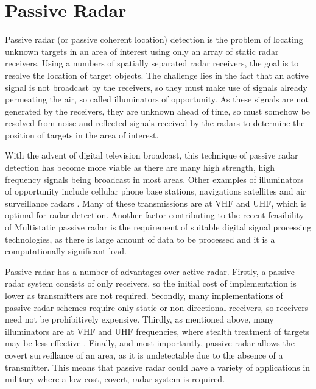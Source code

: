 \documentclass[12pt,openany,a4paper]{book}
\begin{document}
\section{Passive Radar}

Passive radar (or passive coherent location) detection is the problem of locating unknown targets in an area of interest using only an array of static radar receivers. Using a numbers of spatially separated radar receivers, the goal is to resolve the location of target objects. The challenge lies in the fact that an active signal is not broadcast by the receivers, so they must make use of signals already permeating the air, so called illuminators of opportunity. As these signals are not generated by the receivers, they are unknown ahead of time, so must somehow be resolved from noise and reflected signals received by the radars to determine the position of targets in the area of interest.

\bigskip

With the advent of digital television broadcast, this technique of passive radar detection has become more viable as there are many high strength, high frequency signals being broadcast in most areas. Other examples of illuminators of opportunity include cellular phone base stations, navigations satellites and air surveillance radars \cite{Willis1}. Many of these transmissions are at VHF and UHF, which is optimal for radar detection. Another factor contributing to the recent feasibility of Multistatic passive radar is the requirement of suitable digital signal processing technologies, as there is large amount of data to be processed and it is a computationally significant load. 

\bigskip

Passive radar has a number of advantages over active radar. Firstly, a passive radar system consists of only receivers, so the initial cost of implementation is lower as transmitters are not required. Secondly, many implementations of passive radar schemes require only static or non-directional receivers, so receivers need not be prohibitively expensive. Thirdly, as mentioned above, many illuminators are at VHF and UHF frequencies, where stealth treatment of targets may be less effective \cite{HK2}. Finally, and most importantly, passive radar allows the covert surveillance of an area, as it is undetectable due to the absence of a transmitter. This means that passive radar could have a variety of applications in military where a low-cost, covert, radar system is required.
\end{document}

